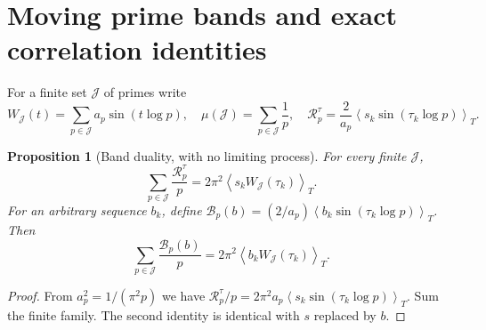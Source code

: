 \documentclass[11pt,reqno]{amsart}
\numberwithin{equation}{section}
\newtheorem{proposition}[theorem]{Proposition}
\newcommand{\av}[1]{\left\langle #1\right\rangle_T}
\begin{document}
\section{Moving prime bands and exact correlation identities}\label{sec:bands}
For a finite set $\mathcal J$ of primes write
\begin{equation}\label{eq:banddef}
W_{\mathcal J}(t)=\sum_{p\in\mathcal J}a_p\sin(t\log p),
\quad \mu(\mathcal J)=\sum_{p\in\mathcal J}\frac1p,
\quad \mathcal R_p^\tau=\frac2{a_p}\av{s_k\sin(\tau_k\log p)}.
\end{equation}
\begin{proposition}[Band duality, with no limiting process]\label{prop:banddual}
For every finite $\mathcal J$,
\begin{equation}\label{eq:banddual}
\sum_{p\in\mathcal J}\frac{\mathcal R_p^\tau}{p}
=2\pi^2\av{s_kW_{\mathcal J}(\tau_k)}.
\end{equation}
For an arbitrary sequence $b_k$, define $\mathcal B_p(b)=(2/a_p)\av{b_k\sin(\tau_k\log p)}$. Then
\begin{equation}\label{eq:bandb}
\sum_{p\in\mathcal J}\frac{\mathcal B_p(b)}p
=2\pi^2\av{b_kW_{\mathcal J}(\tau_k)}.
\end{equation}
\end{proposition}
\begin{proof}
From $a_p^2=1/(\pi^2p)$ we have $\mathcal R_p^\tau/p=2\pi^2a_p\av{s_k\sin(\tau_k\log p)}$. Sum the finite family. The second identity is identical with $s$ replaced by $b$.
\end{proof}
\end{document}
